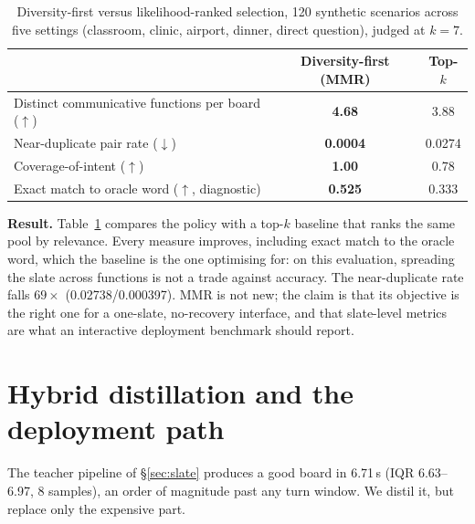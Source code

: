 \documentclass{article}
\begin{document}
\begin{table}[t]
\centering
\small
\caption{Diversity-first versus likelihood-ranked selection, 120 synthetic
scenarios across five settings (classroom, clinic, airport, dinner, direct
question), judged at $k{=}7$.}
\label{tab:selection}
\begin{tabular}{lcc}
\toprule
 & \textbf{Diversity-first (MMR)} & \textbf{Top-$k$} \\
\midrule
Distinct communicative functions per board ($\uparrow$) & \textbf{4.68} & 3.88 \\
Near-duplicate pair rate ($\downarrow$)                 & \textbf{0.0004} & 0.0274 \\
Coverage-of-intent ($\uparrow$)\footnotemark            & \textbf{1.00} & 0.78 \\
Exact match to oracle word ($\uparrow$, diagnostic)      & \textbf{0.525} & 0.333 \\
\bottomrule
\end{tabular}
\end{table}

\textbf{Result.} Table~\ref{tab:selection} compares
the policy with a top-$k$ baseline that ranks the same pool by relevance. Every
measure improves, including exact match to the oracle word, which the baseline
is the one optimising for: on this evaluation, spreading the slate across
functions is not a trade against accuracy. The near-duplicate rate falls
$69\times$ (0.02738/0.000397). MMR is not new; the claim is that its objective is
the right one for a one-slate, no-recovery interface, and that slate-level
metrics are what an interactive deployment benchmark should report.

\section{Hybrid distillation and the deployment path}\label{sec:distil}

The teacher pipeline of \S\ref{sec:slate} produces a good board in 6.71\,s (IQR
6.63--6.97, 8 samples), an order of magnitude past any turn window. We distil
it, but replace only the expensive part.
\end{document}
